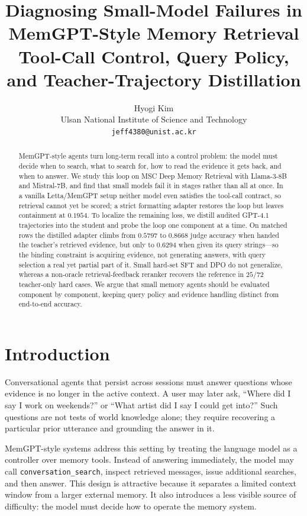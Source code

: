 \documentclass[11pt]{article}
\title{
Diagnosing Small-Model Failures in MemGPT-Style Memory Retrieval\\
\large Tool-Call Control, Query Policy, and Teacher-Trajectory Distillation
}
\author{
Hyogi Kim\\
Ulsan National Institute of Science and Technology\\
\texttt{jeff4380@unist.ac.kr}
}
\newcommand{\tool}[1]{\texttt{#1}}
\begin{document}
\maketitle

\begin{abstract}
MemGPT-style agents turn long-term recall into a control problem: the model must decide when to search, what to search for, how to read the evidence it gets back, and when to answer. We study this loop on MSC Deep Memory Retrieval with Llama-3-8B and Mistral-7B, and find that small models fail it in stages rather than all at once. In a vanilla Letta/MemGPT setup neither model even satisfies the tool-call contract, so retrieval cannot yet be scored; a strict formatting adapter restores the loop but leaves containment at $0.1954$. To localize the remaining loss, we distill audited GPT-4.1 trajectories into the student and probe the loop one component at a time. On matched rows the distilled adapter climbs from $0.5797$ to $0.8668$ judge accuracy when handed the teacher's retrieved evidence, but only to $0.6294$ when given its query strings---so the binding constraint is acquiring evidence, not generating answers, with query selection a real yet partial part of it. Small hard-set SFT and DPO do not generalize, whereas a non-oracle retrieval-feedback reranker recovers the reference in $25/72$ teacher-only hard cases. We argue that small memory agents should be evaluated component by component, keeping query policy and evidence handling distinct from end-to-end accuracy.
\end{abstract}

\section{Introduction}

Conversational agents that persist across sessions must answer questions whose evidence is no longer in the active context. A user may later ask, ``Where did I say I work on weekends?'' or ``What artist did I say I could get into?'' Such questions are not tests of world knowledge alone; they require recovering a particular prior utterance and grounding the answer in it.

MemGPT-style systems address this setting by treating the language model as a controller over memory tools. Instead of answering immediately, the model may call \tool{conversation\_search}, inspect retrieved messages, issue additional searches, and then answer. This design is attractive because it separates a limited context window from a larger external memory. It also introduces a less visible source of difficulty: the model must decide how to operate the memory system.
\end{document}
